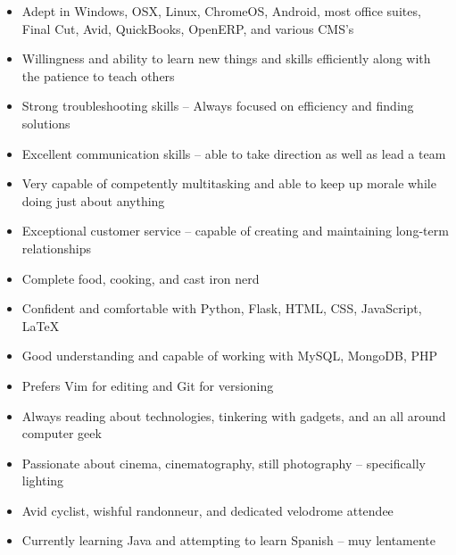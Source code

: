 \documentclass[10pt,letterpaper]{article}			%
\begin{document}
\begin{minipage}[t]{0.49\textwidth}	
	\begin{itemize}
	    \item Adept in Windows, OSX, Linux, ChromeOS, Android, most office suites, \mbox{Final} Cut, Avid, QuickBooks, OpenERP, and various CMS's 
	    \item Willingness and ability to learn new things and skills efficiently along with the patience to teach others
	    \item Strong troubleshooting skills -- Always focused on efficiency and finding solutions
	    \item Excellent communication skills -- able to take direction as well as lead a team
	    \item Very capable of competently multitasking and able to keep up morale while doing just about anything
	    \item Exceptional customer service -- capable of creating and maintaining long-term relationships
	    \item Complete food, cooking, and cast iron nerd
	\end{itemize}
\end{minipage}
\begin{minipage}[t]{0.49\textwidth}
	\begin{itemize}
	    \item Confident and comfortable with Python, Flask, HTML, CSS, JavaScript, \LaTeX
	    \item Good understanding and capable of working with MySQL, MongoDB, PHP
	    \item Prefers Vim for editing and Git for versioning
	    \item Always reading about technologies, tinkering with gadgets, and an all around computer geek
	    \item Passionate about cinema, cinematography, still photography -- specifically lighting
	    \item Avid cyclist, wishful randonneur, and dedicated velodrome attendee
	    \item Currently learning Java and attempting to learn Spanish -- muy lentamente
	\end{itemize}
\end{minipage}
\end{document}
